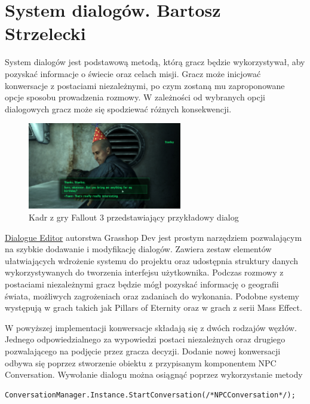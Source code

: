 \section{System dialogów. Bartosz Strzelecki}

System dialogów jest podstawową metodą, którą gracz będzie wykorzystywał, aby pozyskać informacje  o świecie oraz celach misji.
Gracz może inicjować konwersacje z postaciami niezależnymi, po czym zostaną mu zaproponowane opcje sposobu prowadzenia rozmowy.
W zależności od wybranych opcji dialogowych gracz może się spodziewać różnych konsekwencji.


\begin{figure}[h]
\centering
\includegraphics[width=0.6\textwidth]{images/fallout3}
\caption{Kadr z gry Fallout 3 przedstawiający przykładowy dialog}
\end{figure}

\href{https://assetstore.unity.com/packages/tools/utilities/dialogue-editor-168329}{Dialogue Editor} autorstwa Grasshop Dev jest prostym narzędziem pozwalającym na szybkie dodawanie i modyfikację dialogów.
Zawiera zestaw elementów ułatwiających wdrożenie systemu do projektu oraz udostępnia struktury danych wykorzystywanych do tworzenia interfejsu użytkownika.
Podczas rozmowy z postaciami niezależnymi gracz będzie mógł pozyskać informację o geografii świata, możliwych zagrożeniach oraz zadaniach do wykonania. 
Podobne systemy występują w grach takich jak Pillars of Eternity oraz w grach z serii Mass Effect.

W powyższej implementacji konwersacje składają się z dwóch rodzajów węzłów. Jednego odpowiedzialnego za wypowiedzi postaci niezależnych oraz drugiego
pozwalającego na podjęcie przez gracza decyzji.
Dodanie nowej konwersacji odbywa się poprzez stworzenie obiektu z przypisanym komponentem NPC Conversation.
Wywołanie dialogu można osiągnąć poprzez wykorzystanie metody


\begin{verbatim}
ConversationManager.Instance.StartConversation(/*NPCConversation*/);
\end{verbatim}

